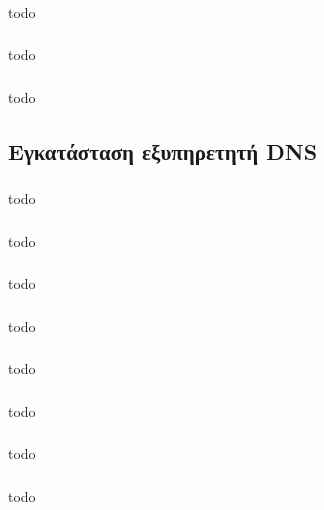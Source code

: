\documentclass[a4paper, 12pt]{article}
\begin{document}
		\subsubsection{}
			todo

		\subsubsection{}
			todo

		\subsubsection{}
			todo

	\subsection{Εγκατάσταση εξυπηρετητή DNS}

		\subsubsection{}
			todo

		\subsubsection{}
			todo

		\subsubsection{}
			todo

		\subsubsection{}
			todo

		\subsubsection{}
			todo

		\subsubsection{}
			todo

		\subsubsection{}
			todo

		\subsubsection{}
			todo
\end{document}
